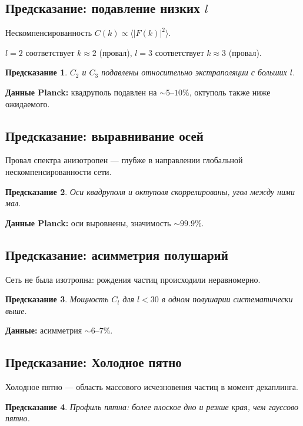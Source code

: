 \documentclass[11pt,a4paper]{article}
\newtheorem{prediction}{Предсказание}[section]
\theoremstyle{definition}
\begin{document}
\subsection{Предсказание: подавление низких $l$}

Нескомпенсированность $C(k) \propto \langle |F(k)|^2 \rangle$.

$l = 2$ соответствует $k \approx 2$ (провал), $l = 3$ соответствует $k \approx 3$ (провал).

\begin{prediction}
$C_2$ и $C_3$ подавлены относительно экстраполяции с больших $l$.
\end{prediction}

\textbf{Данные Planck:} квадруполь подавлен на $\sim 5$--$10\%$, октуполь также ниже ожидаемого.

\subsection{Предсказание: выравнивание осей}

Провал спектра анизотропен --- глубже в направлении глобальной нескомпенсированности сети.

\begin{prediction}
Оси квадруполя и октуполя скоррелированы, угол между ними мал.
\end{prediction}

\textbf{Данные Planck:} оси выровнены, значимость $\sim 99.9\%$.

\subsection{Предсказание: асимметрия полушарий}

Сеть не была изотропна: рождения частиц происходили неравномерно.

\begin{prediction}
Мощность $C_l$ для $l < 30$ в одном полушарии систематически выше.
\end{prediction}

\textbf{Данные:} асимметрия $\sim 6$--$7\%$.

\subsection{Предсказание: Холодное пятно}

Холодное пятно --- область массового исчезновения частиц в момент декаплинга.

\begin{prediction}
Профиль пятна: более плоское дно и резкие края, чем гауссово пятно.
\end{prediction}
\end{document}
